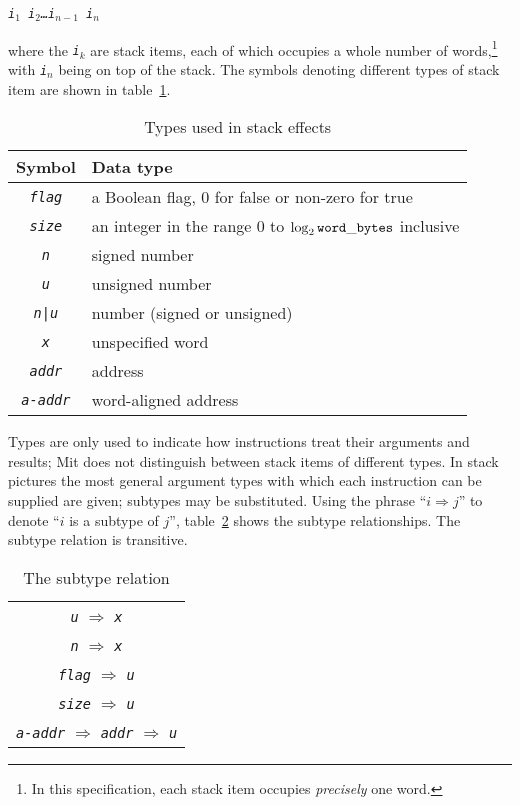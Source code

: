 \documentclass[a4paper]{article}
\newcommand{\spic}[1]{\texttt{\textsl{#1\/}}}
\begin{document}
\centerline{\spic{i$_1$ i$_2$\dots i$_{n-1}$ i$_n$}}

\noindent where the \spic{i$_k$} are stack items, each of which occupies a whole number of words,\footnote{In this specification, each stack item occupies \emph{precisely} one word.} with \spic{i$_n$} being on top of the stack. The symbols denoting different types of stack item are shown in table~\ref{typetable}.

\begin{table}[htbp]
\begin{center}
\begin{tabular}{cl} \toprule
\bf Symbol & \bf Data type \\ \midrule
\spic{flag} & a Boolean flag, $0$ for false or non-zero for true \\
\spic{size} & an integer in the range $0$ to $\log_2{\tt word\_bytes}$ inclusive \\
\spic{n} & signed number \\
\spic{u} & unsigned number \\
\spic{n{\tt |}u} & number (signed or unsigned) \\
\spic{x} & unspecified word \\
\spic{addr} & address \\
\spic{a-addr} & word-aligned address \\
\bottomrule
\end{tabular}
\caption{\label{typetable}Types used in stack effects}
\end{center}
\end{table}

Types are only used to indicate how instructions treat their arguments and
results; Mit does not distinguish between stack items of different types. In
stack pictures the most general argument types with which each instruction can
be supplied are given; subtypes may be substituted. Using the phrase ``$i
\Rightarrow j$'' to denote ``$i$\/ is a subtype of $j$\/'', table~\ref{reltable}
shows the subtype relationships. The subtype relation is transitive.

\begin{table}[htbp]
\begin{center}
\begin{tabular}{c} \toprule
\spic{u} $\Rightarrow$ \spic{x} \\
\spic{n} $\Rightarrow$ \spic{x} \\
\spic{flag} $\Rightarrow$ \spic{u} \\
\spic{size} $\Rightarrow$ \spic{u} \\
\spic{a-addr} $\Rightarrow$ \spic{addr} $\Rightarrow$ \spic{u} \\
 \bottomrule
\end{tabular}
\caption{\label{reltable}The subtype relation}
\end{center}
\end{table}
\end{document}
